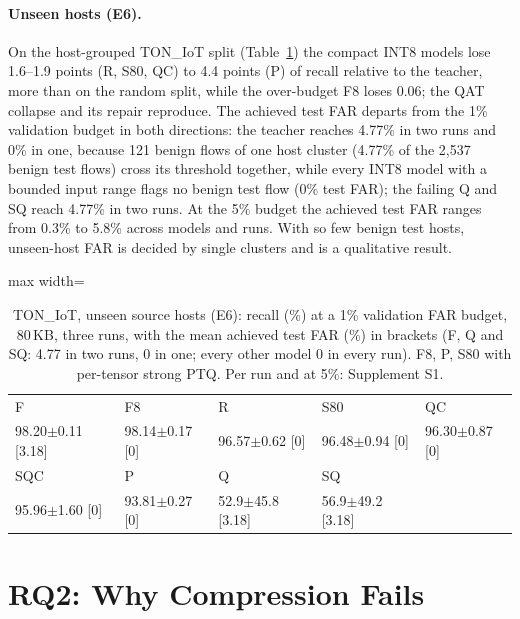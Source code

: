 \documentclass[sigplan,10pt,review,anonymous,nonacm]{acmart}
\newcommand{\ton}{TON\_IoT\xspace}
\begin{document}
\paragraph{Unseen hosts (E6).} On the host-grouped \ton split (Table~\ref{tab:e6}) the compact INT8
models lose 1.6--1.9 points (R, S80, QC) to 4.4 points (P) of recall relative to the teacher, more than on
the random split, while the over-budget F8 loses 0.06; the QAT collapse and its repair reproduce. The
achieved test FAR departs from the 1\% validation budget in both directions: the teacher reaches 4.77\% in
two runs and 0\% in one, because 121 benign flows of one host cluster (4.77\% of the 2,537 benign test
flows) cross its threshold together, while every INT8 model with a bounded input range flags no benign
test flow (0\% test FAR); the failing Q and SQ reach 4.77\% in two runs. At the 5\% budget the achieved test FAR ranges from 0.3\% to 5.8\% across models and runs.
With so few benign test hosts, unseen-host FAR is decided by single clusters and is a qualitative result.

\begin{table}[t]
\caption{\ton, unseen source hosts (E6): recall (\%) at a 1\% validation FAR budget, 80\,KB, three runs,
with the mean achieved test FAR (\%) in brackets (F, Q and SQ: 4.77 in two runs, 0 in one; every other model 0 in every run).
F8, P, S80 with per-tensor strong PTQ. Per run and at 5\%: Supplement S1.}
\label{tab:e6}
\small\setlength{\tabcolsep}{3pt}
\begin{adjustbox}{max width=\columnwidth}
\begin{tabular}{lllll}
\toprule
F & F8 & R & S80 & QC \\
98.20$\pm$0.11 [3.18] & 98.14$\pm$0.17 [0] & 96.57$\pm$0.62 [0] & 96.48$\pm$0.94 [0] & 96.30$\pm$0.87 [0] \\
\midrule
SQC & P & Q & SQ & \\
95.96$\pm$1.60 [0] & 93.81$\pm$0.27 [0] & 52.9$\pm$45.8 [3.18] & 56.9$\pm$49.2 [3.18] & \\
\bottomrule
\end{tabular}
\end{adjustbox}
\end{table}

\section{RQ2: Why Compression Fails}\label{sec:rq2}
\end{document}
